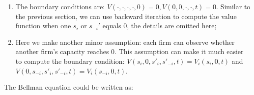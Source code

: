 \documentclass[12pt,letterpaper]{article}
\begin{document}
\begin{enumerate}
\begin{itemize}
        \item With probability $1-\lambda q_{xy} - \lambda q_{yx} $, both firms obtain demand $0$, the system obtain reward $p_y$.
            \begin{itemize}
                \item with probability $\frac{\lambda q_{xy}}{1-\lambda q_{yx}} \cdot \frac{\lambda q_{yx}}{1-\lambda q_{xy}}$, firm $-i$ assumes firm $i$ has demand $1$, and firm $i$ assumes firm $-i$ has demand $1$. The state is transitioned to $(s_i,s_{-i},s'_i-1,s'_{-i}-1,t-1)$;
                \item with probability $\frac{\lambda q_{xy}}{1-\lambda q_{yx}} \cdot \frac{1-\lambda q_{yx}-\lambda q_{xy}}{1-\lambda q_{xy}}$, the state is transitioned to $(s_i,s_{-i},s'_i-1,s'_{-i},t-1)$;
                \item with probability $\frac{1-\lambda q_{yx}-\lambda q_{xy}}{1-\lambda q_{yx}} \cdot \frac{\lambda q_{yx}}{1-\lambda q_{xy}}$, the state is transitioned to $(s_i,s_{-i},s'_i,s'_{-i}-1,t-1)$;
                \item with probability $\frac{1-\lambda q_{yx}-\lambda q_{xy}}{1-\lambda q_{yx}} \cdot \frac{1-\lambda q_{yx}-\lambda q_{xy}}{1-\lambda q_{xy}}$, the state is transitioned to $(s_i,s_{-i},s'_i,s'_{-i},t-1)$.
            \end{itemize}
    \end{itemize}
    \item The boundary conditions are: $V(\cdot,\cdot,\cdot,\cdot,0)=0, V(0,0,\cdot,\cdot,t)=0$. Similar to the previous section, we can use backward iteration to compute the value function when one $s_i$ or $s_{-i}'$ equals $0$, the details are omitted here;
    \item Here we make another minor assumption: each firm can observe whether another firm's capacity reaches $0$. This assumption can make it much easier to compute the boundary condition: $V(s_i,0,s'_i,s'_{-i},t)=V_i(s_i,0,t)$ and $V(0,s_{-i},s'_i,s'_{-i},t)=V_i(s_{-i},0,t)$.
\end{enumerate}

The Bellman equation could be written as:
\end{document}
